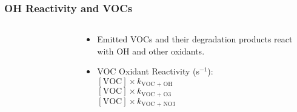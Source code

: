 \begin{frame}
    \frametitle{OH Reactivity and VOCs}
    \vspace{-1cm}

    \begin{columns}[onlytextwidth]
        \begin{column}{0.45\textwidth}
            \begin{figure}
                \centering
                \def\svgwidth{\columnwidth}
                 
            \end{figure}
        \end{column}%
        \begin{column}{0.55\textwidth}
            \begin{center}
                \begin{itemize}
                    \item Emitted VOCs and their degradation products react \\with OH and other oxidants. \vspace{4mm}
                    \item VOC Oxidant Reactivity (s$^{-1}$): \\ \hspace{2mm} $[\text{VOC}] \times k_{\text{VOC + OH}}$ \\ \hspace{2mm} $[\text{VOC}] \times k_{\text{VOC + O3}}$ \\ \hspace{2mm} $[\text{VOC}] \times k_{\text{VOC + NO3}}$ 
                \end{itemize}
            \end{center}
        \end{column}
    \end{columns}
\end{frame}

